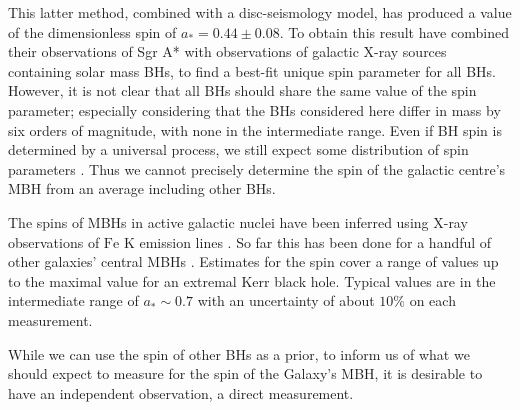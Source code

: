 \documentclass[useAMS,usedcolumn,usegraphicx,usenatbib]{mn2e}
\begin{document}
This latter method, combined with a disc-seismology model, has produced a value of the dimensionless spin of $a_\ast = 0.44 \pm 0.08$. To obtain this result \citet{Kato2010} have combined their observations of Sgr A* with observations of galactic X-ray sources containing solar mass BHs, to find a best-fit unique spin parameter for all BHs. However, it is not clear that all BHs should share the same value of the spin parameter; especially considering that the BHs considered here differ in mass by six orders of magnitude, with none in the intermediate range. Even if BH spin is determined by a universal process, we still expect some distribution of spin parameters \citep{King2008, Berti2008}. Thus we cannot precisely determine the spin of the galactic centre's MBH from an average including other BHs.

The spins of MBHs in active galactic nuclei have been inferred using X-ray observations of $\mathrm{Fe}$ $\mathrm{K}$ emission lines \citep{Miller2007, McClintock2011}. So far this has been done for a handful of other galaxies' central MBHs \citep{Brenneman2006, Miniutti2009, Schmoll2009, delaCallePerez2010, Zoghbi2010, Nardini2011,  Patrick2011}. Estimates for the spin cover a range of values up to the maximal value for an extremal Kerr black hole. Typical values are in the intermediate range of $a_\ast \sim 0.7$ with an uncertainty of about $10\%$ on each measurement.

While we can use the spin of other BHs as a prior, to inform us of what we should expect to measure for the spin of the Galaxy's MBH, it is desirable to have an independent observation, a direct measurement.
\end{document}
